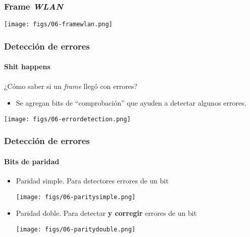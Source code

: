 \documentclass[letter]{beamer}
\begin{document}
\begin{frame}
  \frametitle{Frame {\em WLAN}}

  \begin{center}
    \texttt{[image: figs/06-framewlan.png]}
  \end{center}

\end{frame}

\begin{frame}
  \frametitle{Detección de errores}
  \framesubtitle{Shit happens}
  
  ¿Cómo saber si un {\em frame} llegó con errores?
  
  \begin{itemize}
    \item Se agregan bits de ``comprobación'' que ayuden a detectar algunos errores.
  \end{itemize}

  \begin{center}
    \texttt{[image: figs/06-errordetection.png]}
  \end{center}


\end{frame}

\begin{frame}
  \frametitle{Detección de errores}
  \framesubtitle{Bits de paridad}

  \begin{itemize}
    \item Paridad simple. Para detectores errores de un bit
      \begin{center}
        \texttt{[image: figs/06-paritysimple.png]}
      \end{center}
    \item Paridad doble. Para detectar {\bf y corregir} errores de un bit
      \begin{center}
        \texttt{[image: figs/06-paritydouble.png]}
      \end{center}
  \end{itemize}

\end{frame}
\end{document}
